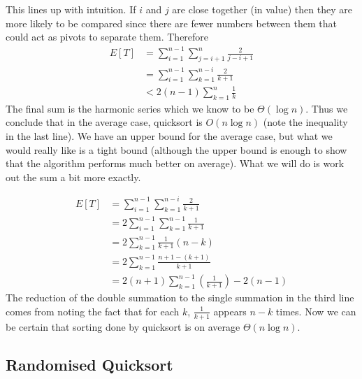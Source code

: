 This lines up with intuition. If $i$ and $j$ are close together (in value) then they are more likely to be compared since there are fewer numbers between them that could act as pivots to separate them. Therefore
\begin{align*}
    E[T] &= \sum_{i = 1}^{n - 1} \sum_{j = i + 1}^{n} \frac{2}{j - i + 1}\\
    &= \sum_{i = 1}^{n - 1} \sum_{k = 1}^{n - i} \frac{2}{k + 1}\\
    &< 2(n - 1) \sum_{k = 1}^{n} \frac{1}{k}
\end{align*}
The final sum is the harmonic series which we know to be $\Theta(\log n)$. Thus we conclude that in the average case, quicksort is $O(n \log n)$ (note the inequality in the last line). We have an upper bound for the average case, but what we would really like is a tight bound (although the upper bound is enough to show that the algorithm performs much better on average). What we will do is work out the sum a bit more exactly. 

\begin{align*}
    E[T] &= \sum_{i = 1}^{n - 1} \sum_{k = 1}^{n - i} \frac{2}{k + 1}\\
    &= 2 \sum_{i = 1}^{n - 1} \sum_{k = 1}^{n - 1} \frac{1}{k + 1}\\
    &= 2 \sum_{k = 1}^{n - 1} \frac{1}{k + 1} (n - k)\\
    &= 2 \sum_{k = 1}^{n - 1} \frac{n + 1 - (k + 1)}{k + 1}\\
    &= 2(n + 1) \sum_{k = 1}^{n - 1} \left( \frac{1}{k + 1} \right) - 2(n - 1)
\end{align*}
The reduction of the double summation to the single summation in the third line comes from noting the fact that for each $k$, $\frac{1}{k + 1}$ appears $n - k$ times. Now we can be certain that sorting done by quicksort is on average $\Theta(n \log n)$. 

\subsection{Randomised Quicksort}

